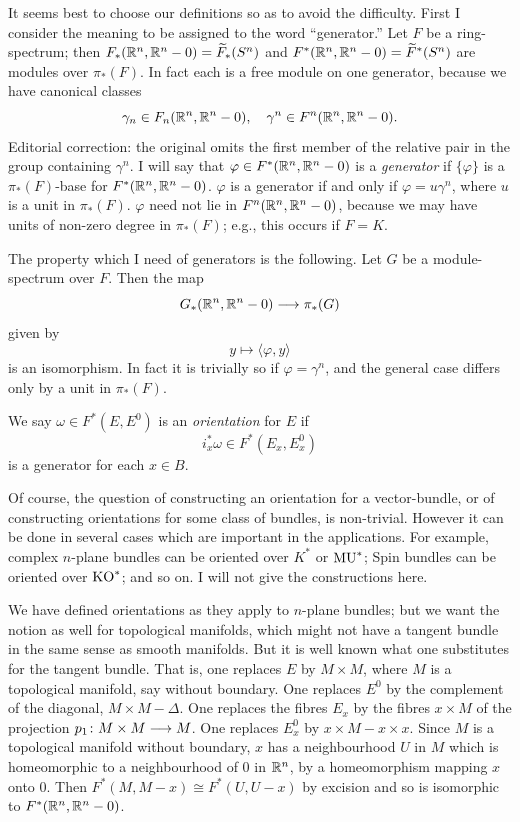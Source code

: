 \documentclass[../main]{subfiles}
\begin{document}
It seems best to choose our definitions so as to avoid the difficulty. First I consider the meaning to be assigned to the word ``generator.'' Let $F$ be a ring-spectrum; then $F_*(\mathbb{R}^n,\mathbb{R}^n-0) = \widetilde{F}_*(S^n)$ and $F^*(\mathbb{R}^n,\mathbb{R}^n-0) = \widetilde{F}^*(S^n)$ are modules over $\pi_*(F)$. In fact each is a free module on one generator, because we have canonical classes
\[\gamma_n \in F_n(\mathbb{R}^n,\mathbb{R}^n-0), \quad \gamma^n \in F^n(\mathbb{R}^n,\mathbb{R}^n-0).\]
\noindent Editorial correction: the original omits the first member of the relative pair in the group containing $\gamma^n$.
I will say that $\varphi \in F^*(\mathbb{R}^n,\mathbb{R}^n-0)$ is a \emph{generator}  if $\{\varphi\}$ is a $\pi_*(F)$-base for $F^*(\mathbb{R}^n,\mathbb{R}^n-0)$. $\varphi$ is a generator if and only if $\varphi = u \gamma^n$, where $u$ is a unit in $\pi_*(F)$. $\varphi$ need not lie in $F^n(\mathbb{R}^n,\mathbb{R}^n-0)$, because we may have units of non-zero degree in $\pi_*(F)$; e.g., this occurs if $F=K$.

The property which I need of generators is the following. Let $G$ be a module-spectrum over $F$. Then the map \[G_*(\mathbb{R}^n,\mathbb{R}^n-0) \longrightarrow \pi_*(G)\]
given by 
\[y \mapsto  \langle \varphi , y \rangle\]
is an isomorphism. In fact it is trivially so if $\varphi = \gamma^n$, and the general case differs only by a unit in $\pi_*(F)$.

We say $\omega \in  F^*(E,E^0)$ is an \emph{orientation}  for $E$ if
\[i_x^* \omega \in F^*(E_x,E_x^0)\]
is a generator for each $x \in B$.

Of course, the question of constructing an orientation for a vector-bundle, or of constructing orientations for some class of bundles, is non-trivial. However it can be done in several cases which are important in the applications. For example, complex $n$-plane bundles can be oriented over $K^*$ or $\mathrm{MU}^*$; Spin bundles can be oriented over $\mathrm{KO}^*$; and so on. I will not give the constructions here.

We have defined orientations as they apply to $n$-plane bundles; but we want the notion as well for topological manifolds, which might not have a tangent bundle in the same sense as smooth manifolds. But it is well known what one substitutes for the tangent bundle. That is, one replaces $E$ by $M \times M$, where $M$ is a topological manifold, say without boundary. One replaces $E^0$ by the complement of the diagonal, $M \times M - \Delta$. One replaces the fibres $E_x$ by the fibres $x \times M$ of the projection $p_1 \colon M \times M \longrightarrow M$. One replaces $E^0_x$ by $x \times M - x \times x$. Since $M$ is a topological manifold without boundary, $x$ has a neighbourhood $U$ in $M$ which is homeomorphic to a neighbourhood of 0 in $\mathbb{R}^n$, by a homeomorphism mapping $x$ onto 0. Then $F^*(M,M-x) \cong F^*(U,U-x)$ by excision and so is isomorphic to $F^*(\mathbb{R}^n,\mathbb{R}^n - 0)$.
\end{document}
